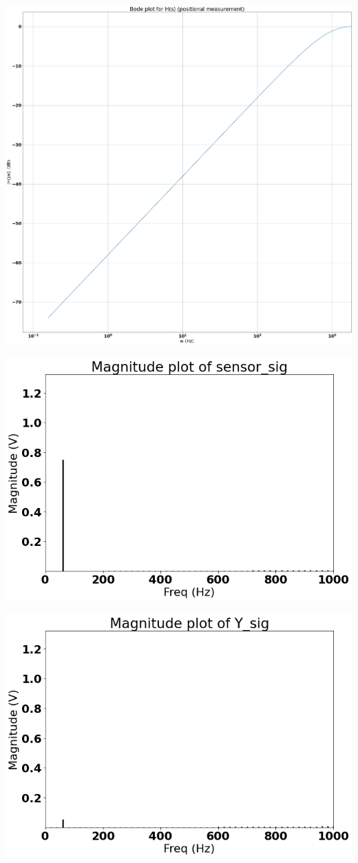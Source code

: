 \documentclass[12pt]{report}
\begin{document}
    \includegraphics[scale = 0.2]{Figure 2022-04-20 163927 (7).png}
    
    \includegraphics[scale = 0.5]{Figure 2022-04-20 163927 (3).png}

    \includegraphics[scale = 0.5]{Figure 2022-04-20 163927 (14).png}
    
\end{document}
